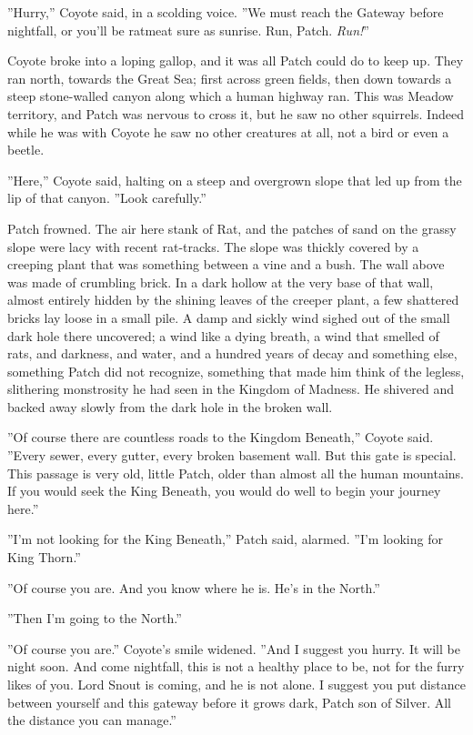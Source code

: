 \documentclass[12pt]{book}
\begin{document}
 ''Hurry,'' Coyote said, in a scolding voice. ''We must reach the Gateway before nightfall, or you'll be ratmeat sure as sunrise. Run, Patch. {\it Run!}''\par
 Coyote broke into a loping gallop, and it was all Patch could do to keep up. They ran north, towards the Great Sea; first across green fields, then down towards a steep stone-walled canyon along which a human highway ran. This was Meadow territory, and Patch was nervous to cross it, but he saw no other squirrels. Indeed while he was with Coyote he saw no other creatures at all, not a bird or even a beetle.\par
 ''Here,'' Coyote said, halting on a steep and overgrown slope that led up from the lip of that canyon. ''Look carefully.''\par
 Patch frowned. The air here stank of Rat, and the patches of sand on the grassy slope were lacy with recent rat-tracks. The slope was thickly covered by a creeping plant that was something between a vine and a bush. The wall above was made of crumbling brick. In a dark hollow at the very base of that wall, almost entirely hidden by the shining leaves of the creeper plant, a few shattered bricks lay loose in a small pile. A damp and sickly wind sighed out of the small dark hole there uncovered; a wind like a dying breath, a wind that smelled of rats, and darkness, and water, and a hundred years of decay %
 and something else, something Patch did not recognize, something that made him think of the legless, slithering monstrosity he had seen in the Kingdom of Madness. He shivered and backed away slowly from the dark hole in the broken wall.\par
 ''Of course there are countless roads to the Kingdom Beneath,'' Coyote said. ''Every sewer, every gutter, every broken basement wall. But this gate is special. This passage is very old, little Patch, older than almost all the human mountains. If you would seek the King Beneath, you would do well to begin your journey here.''\par
 ''I'm not looking for the King Beneath,'' Patch said, alarmed. ''I'm looking for King Thorn.''\par
 ''Of course you are. And you know where he is. He's in the North.''\par
 ''Then I'm going to the North.''\par
 ''Of course you are.'' Coyote's smile widened. ''And I suggest you hurry. It will be night soon. And come nightfall, this is not a healthy place to be, not for the furry likes of you. Lord Snout is coming, and he is not alone. I suggest you put distance between yourself and this gateway before it grows dark, Patch son of Silver. All the distance you can manage.''\par
\end{document}
